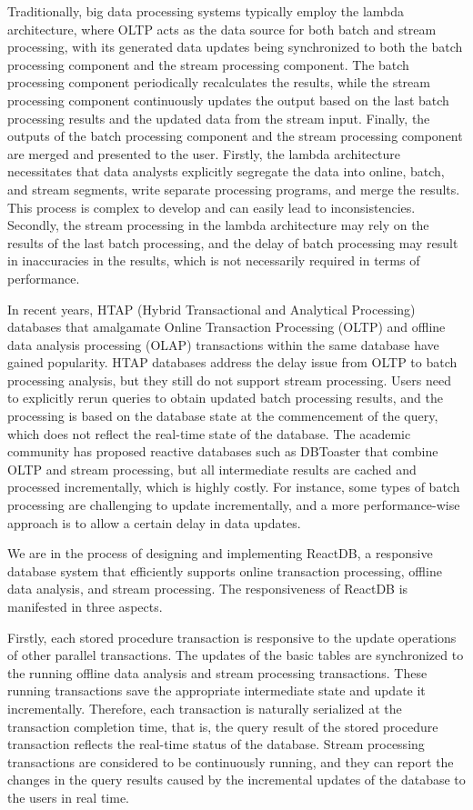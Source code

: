 Traditionally, big data processing systems typically employ the lambda architecture, where OLTP acts as the data source for both batch and stream processing, with its generated data updates being synchronized to both the batch processing component and the stream processing component. The batch processing component periodically recalculates the results, while the stream processing component continuously updates the output based on the last batch processing results and the updated data from the stream input. Finally, the outputs of the batch processing component and the stream processing component are merged and presented to the user. Firstly, the lambda architecture necessitates that data analysts explicitly segregate the data into online, batch, and stream segments, write separate processing programs, and merge the results. This process is complex to develop and can easily lead to inconsistencies. Secondly, the stream processing in the lambda architecture may rely on the results of the last batch processing, and the delay of batch processing may result in inaccuracies in the results, which is not necessarily required in terms of performance.

In recent years, HTAP (Hybrid Transactional and Analytical Processing) databases that amalgamate Online Transaction Processing (OLTP) and offline data analysis processing (OLAP) transactions within the same database have gained popularity. HTAP databases address the delay issue from OLTP to batch processing analysis, but they still do not support stream processing. Users need to explicitly rerun queries to obtain updated batch processing results, and the processing is based on the database state at the commencement of the query, which does not reflect the real-time state of the database. The academic community has proposed reactive databases such as DBToaster that combine OLTP and stream processing, but all intermediate results are cached and processed incrementally, which is highly costly. For instance, some types of batch processing are challenging to update incrementally, and a more performance-wise approach is to allow a certain delay in data updates.

We are in the process of designing and implementing ReactDB, a responsive database system that efficiently supports online transaction processing, offline data analysis, and stream processing. The responsiveness of ReactDB is manifested in three aspects. 

Firstly, each stored procedure transaction is responsive to the update operations of other parallel transactions. The updates of the basic tables are synchronized to the running offline data analysis and stream processing transactions. These running transactions save the appropriate intermediate state and update it incrementally. Therefore, each transaction is naturally serialized at the transaction completion time, that is, the query result of the stored procedure transaction reflects the real-time status of the database. Stream processing transactions are considered to be continuously running, and they can report the changes in the query results caused by the incremental updates of the database to the users in real time.

